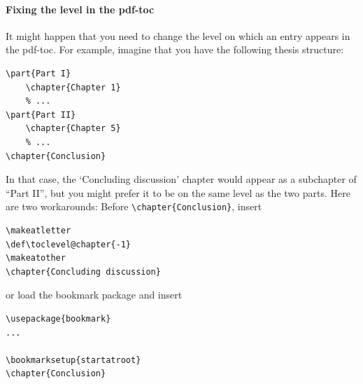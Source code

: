 \paragraph{Fixing the level in the pdf-toc}
It might happen that you need to change the level on which an entry appears in the pdf-toc. For example, imagine that you have the following thesis structure:
\begin{lstlisting}
\part{Part I}
	\chapter{Chapter 1}
	% ... 
\part{Part II}
	\chapter{Chapter 5}
	% ...
\chapter{Conclusion}
\end{lstlisting}
In that case, the `Concluding discussion' chapter would appear as a subchapter of ``Part II'', but you might prefer it to be on the same level as the two parts. Here are two workarounds:
Before \verb|\chapter{Conclusion}|, insert
\begin{lstlisting}
\makeatletter
\def\toclevel@chapter{-1}
\makeatother
\chapter{Concluding discussion}
\end{lstlisting}
or load the bookmark package and insert
\begin{lstlisting}
\usepackage{bookmark}
...

\bookmarksetup{startatroot}
\chapter{Conclusion}
\end{lstlisting}


